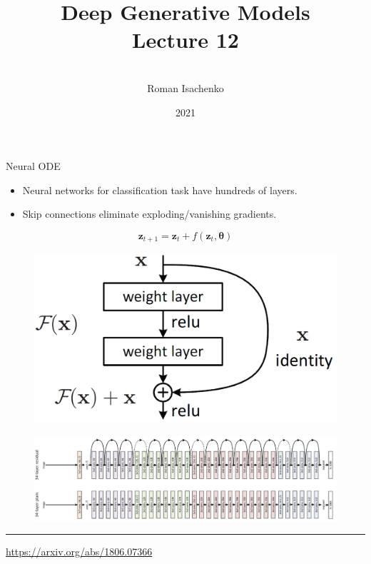 \documentclass{beamer}
\title[\hbox to 56mm{Deep Generative Models  \hfill\insertframenumber\,/\,\inserttotalframenumber}]
{Deep Generative Models \\ Lecture 12}
\author[Roman Isachenko]{\\Roman Isachenko}
\institute[Ozon]{Ozon Masters \\
}
\date{2021}
\newcommand{\bz}{\mathbf{z}}
\newcommand{\btheta}{\boldsymbol{\theta}}
\begin{document}
\begin{frame}
\titlepage
\end{frame}
\begin{frame}{Neural ODE}
\begin{minipage}[t]{0.6\columnwidth}
\vspace{0.2cm}
\begin{itemize}
	\item Neural networks for classification task have hundreds of layers.
	\item Skip connections eliminate exploding/vanishing gradients.
\end{itemize}
\[
	\bz_{t + 1} = \bz_t + f(\bz_t, \btheta)
\]
\end{minipage}%
\begin{minipage}[t]{0.4\columnwidth}
\begin{figure}
    \centering
    \includegraphics[width=0.95\linewidth]{figs/resnet_1.png}
\end{figure}
\end{minipage}
\begin{figure}
    \centering
    \includegraphics[width=\linewidth]{figs/resnet_2.png}
\end{figure}
\vfill
\hrule\medskip
{\scriptsize \href{https://arxiv.org/abs/1806.07366}{https://arxiv.org/abs/1806.07366}}   
\end{frame}
\end{document}
